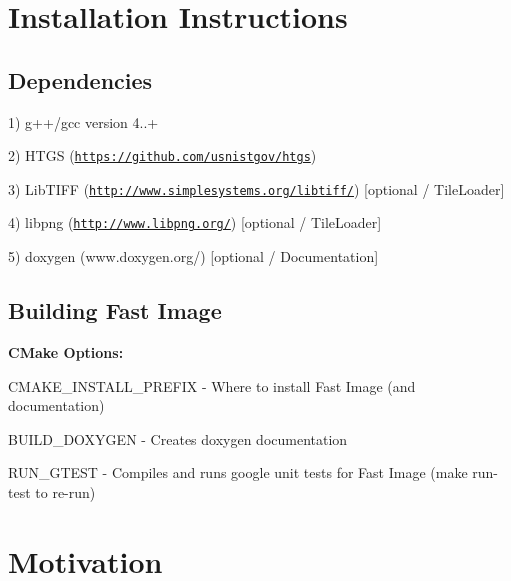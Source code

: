 \section*{Installation Instructions}

\subsection*{Dependencies}

1) g++/gcc version 4..+

2) H\+T\+GS (\href{https://github.com/usnistgov/htgs}{\tt https\+://github.\+com/usnistgov/htgs})

3) Lib\+T\+I\+FF (\href{http://www.simplesystems.org/libtiff/}{\tt http\+://www.\+simplesystems.\+org/libtiff/}) \mbox{[}optional / Tile\+Loader\mbox{]}

4) libpng (\href{http://www.libpng.org/}{\tt http\+://www.\+libpng.\+org/}) \mbox{[}optional / Tile\+Loader\mbox{]}

5) doxygen (www.\+doxygen.\+org/) \mbox{[}optional / Documentation\mbox{]}

\subsection*{Building Fast Image}

{\bfseries C\+Make Options\+:}

C\+M\+A\+K\+E\+\_\+\+I\+N\+S\+T\+A\+L\+L\+\_\+\+P\+R\+E\+F\+IX -\/ Where to install Fast Image (and documentation)

B\+U\+I\+L\+D\+\_\+\+D\+O\+X\+Y\+G\+EN -\/ Creates doxygen documentation

R\+U\+N\+\_\+\+G\+T\+E\+ST -\/ Compiles and runs google unit tests for Fast Image (\textquotesingle{}make run-\/test\textquotesingle{} to re-\/run)




\section*{Motivation}

